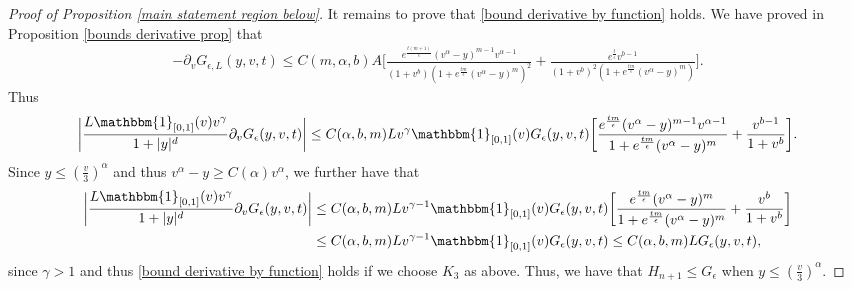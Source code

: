 \documentclass[11pt]{article}
\numberwithin{equation}{section}
\begin{document}
\begin{proof}[Proof of Proposition \ref{main statement region below}]
It remains to prove that \eqref{bound derivative by function} holds. We have proved in Proposition \ref{bounds derivative prop} that
  \begin{align*}
           -\partial_{v}G_{\epsilon,L}(y,v,t)\leq C(m,\alpha,b)A\bigg[\frac{e^{\frac{t(m+1)}{\epsilon}}(v^{\alpha}-y)^{m-1}v^{\alpha-1}}{(1+v^{b})(1+e^{\frac{tm}{\epsilon}}(v^{\alpha}-y)^{m})^{2}}+\frac{e^{\frac{t}{\epsilon}}v^{b-1}}{(1+v^{b})^{2}(1+e^{\frac{tm}{\epsilon}}(v^{\alpha}-y)^{m})}\bigg].
     \end{align*}
Thus
\begin{align*}
     \bigg|\frac{L\mathbbm{1}_{[0,1]}(v)v^{\gamma}}{1+|y|^{d}}\partial_{v}G_{\epsilon}(y,v,t)\bigg|\leq C(\alpha,b,m)Lv^{\gamma}\mathbbm{1}_{[0,1]}(v) G_{\epsilon}(y,v,t)\bigg[\frac{e^{\frac{tm}{\epsilon}}(v^{\alpha}-y)^{m-1}v^{\alpha-1}}{1+e^{\frac{tm}{\epsilon}}(v^{\alpha}-y)^{m}}+\frac{v^{b-1}}{1+v^{b}}\bigg].
\end{align*}
Since $y\leq (\frac{v}{3})^{\alpha}$ and thus $v^{\alpha}-y\geq C(\alpha) v^{\alpha}$, we further have that
\begin{align}
     \bigg|\frac{L\mathbbm{1}_{[0,1]}(v)v^{\gamma}}{1+|y|^{d}}\partial_{v}G_{\epsilon}(y,v,t)\bigg|&\leq C(\alpha,b,m)L v^{\gamma-1}\mathbbm{1}_{[0,1]}(v) G_{\epsilon}(y,v,t)\bigg[\frac{e^{\frac{tm}{\epsilon}}(v^{\alpha}-y)^{m}}{1+e^{\frac{tm}{\epsilon}}(v^{\alpha}-y)^{m}}+\frac{v^{b}}{1+v^{b}}\bigg]\nonumber\\
     &\leq  C(\alpha,b,m)L v^{\gamma-1}\mathbbm{1}_{[0,1]}(v) G_{\epsilon}(y,v,t) \leq C(\alpha,b,m)L G_{\epsilon}(y,v,t) ,\label{def m2 supersol}
\end{align}
since $\gamma>1$ and thus \eqref{bound derivative by function} holds if we choose $K_{3}$ as above. Thus, we have that $H_{n+1}\leq G_{\epsilon}$ when $y\leq (\frac{v}{3})^{\alpha}$.



\end{proof}
\end{document}
